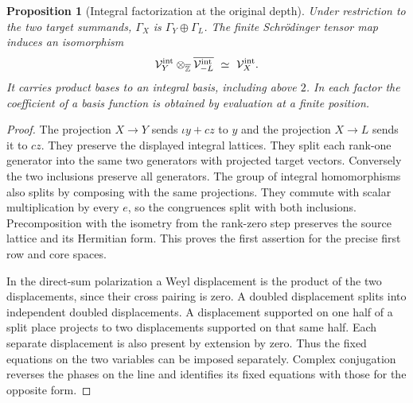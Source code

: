 \documentclass[a4paper,11pt]{article}
\newtheorem{proposition}{Proposition}[section]
\theoremstyle{definition}
\theoremstyle{remark}
\newcommand{\ZZ}{\mathbb Z}\newcommand{\ord}{\operatorname{ord}}
\numberwithin{equation}{section}
\begin{document}
\begin{proposition}[Integral factorization at the original depth]
\label{prop:depth245}
Under restriction to the two target summands, \(\Gamma_X\) is
\(\Gamma_Y\oplus\Gamma_L\). The finite Schr\"odinger tensor map
induces an isomorphism
\[
 \mathcal V_Y^{\rm int}\otimes_{\overline{\ZZ}}
      \overline{\mathcal V_{-L}^{\rm int}}
        \ \simeq\ \mathcal V_X^{\rm int}.
\]
It carries product bases to an integral basis, including above \(2\).
In each factor the coefficient of a basis function is obtained by
evaluation at a finite position.
\end{proposition}
\begin{proof}
The projection \(X\to Y\) sends \(\iota y+c z\) to \(y\) and the
projection \(X\to L\) sends it to \(cz\). They preserve the displayed
integral lattices. They split each rank-one generator into the same
two generators with projected target vectors. Conversely the two
inclusions preserve all generators. The group of integral homomorphisms
also splits by composing with the same projections. They commute with
scalar multiplication by every \(e\), so the congruences split with
both inclusions. Precomposition with the isometry from the rank-zero
step preserves the source lattice and its Hermitian form. This proves
the first assertion for the precise first row and core spaces.

In the direct-sum polarization a Weyl displacement is the product
of the two displacements, since their cross pairing is zero.
A doubled displacement splits into independent doubled displacements.
A displacement supported on one half of a split place projects to
two displacements supported on that same half. Each separate
displacement is also present by extension by zero. Thus the fixed
equations on the two variables can be imposed separately. Complex
conjugation reverses the phases on the line and identifies its fixed
equations with those for the opposite form.


\end{proof}
\end{document}
